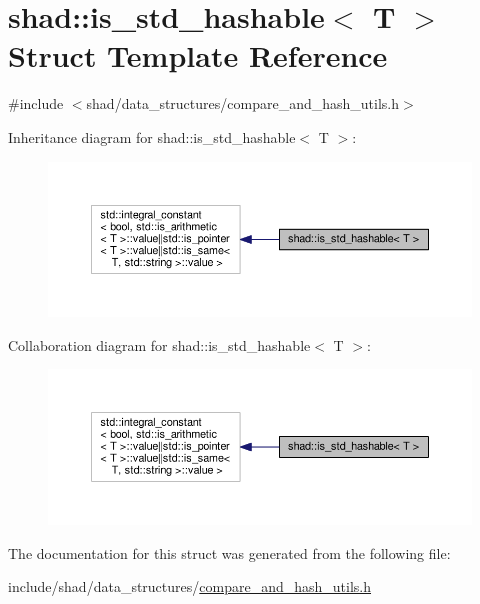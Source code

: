 \hypertarget{structshad_1_1is__std__hashable}{\section{shad\-:\-:is\-\_\-std\-\_\-hashable$<$ T $>$ Struct Template Reference}
\label{structshad_1_1is__std__hashable}
}


{\ttfamily \#include $<$shad/data\-\_\-structures/compare\-\_\-and\-\_\-hash\-\_\-utils.\-h$>$}



Inheritance diagram for shad\-:\-:is\-\_\-std\-\_\-hashable$<$ T $>$\-:
\nopagebreak
\begin{figure}[H]
\begin{center}
\leavevmode
\includegraphics[width=350pt]{structshad_1_1is__std__hashable__inherit__graph}
\end{center}
\end{figure}


Collaboration diagram for shad\-:\-:is\-\_\-std\-\_\-hashable$<$ T $>$\-:
\nopagebreak
\begin{figure}[H]
\begin{center}
\leavevmode
\includegraphics[width=350pt]{structshad_1_1is__std__hashable__coll__graph}
\end{center}
\end{figure}


The documentation for this struct was generated from the following file\-:\begin{DoxyCompactItemize}
\item 
include/shad/data\-\_\-structures/\hyperlink{compare__and__hash__utils_8h}{compare\-\_\-and\-\_\-hash\-\_\-utils.\-h}\end{DoxyCompactItemize}
